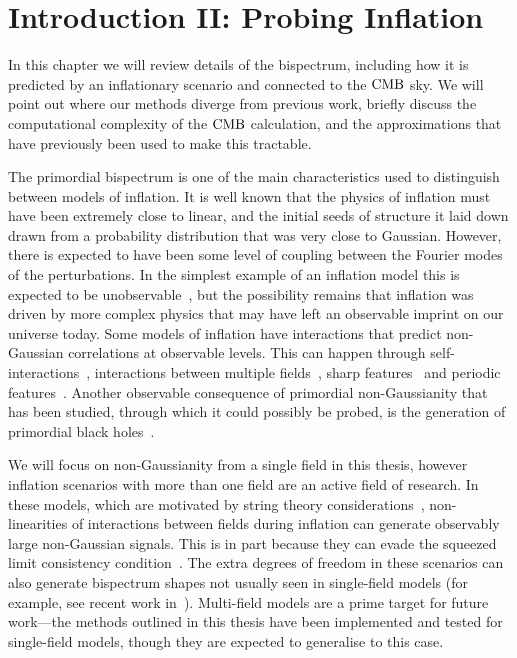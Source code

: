%
\chapter{Introduction II: Probing Inflation}\label{chapter:intro_bispectra}
In this chapter we will review details of the bispectrum, including how it is predicted
by an inflationary scenario and connected to the $\text{CMB}$ sky.
We will point out where our methods diverge from previous work,
briefly discuss the computational complexity of the $\text{CMB}$ calculation, and
the approximations that have previously been used to make this tractable.


The primordial bispectrum is one of the main
characteristics used to distinguish between models of inflation. It is well
known that the physics of inflation must have been extremely close
to linear, and the initial seeds of structure it laid down
drawn from a probability distribution that was
very close to Gaussian. However, there is expected to have been some level of coupling
between the Fourier modes of the perturbations.
In the simplest example of an inflation model this is
expected to be unobservable~\cite{Maldacena},
but the possibility remains that inflation was driven by
more complex physics that may have left an observable imprint on our universe today.
Some models of inflation have interactions that predict non-Gaussian
correlations at observable levels. This can happen through
self-interactions~\cite{px_burrage,dbi_in_the_sky},
interactions between multiple fields~\cite{Byrnes_2010, Gao_turn,
achucarro_multifield1, achucarro_multifield2, achucarro_robust_16, achucarro_natural,
achucarro_quad_viability, achucarro_gsr_cs_14, achucarro_cs_reduction_13,
achucarro_gong_cs_corr, achucarro_cs_12, achucarro_eft, curvaton_comprehensive},
sharp features~\cite{adshead, gsr, step_novaes}
and periodic features~\cite{flauger_pajer_resonant, Pajer_2013, Meerburg_2012, Meerburg_osc, Meerburg_2010,
Barnaby_2011, Peiris_2013, Easther_2013, Cabass_2018, Behbahani_2011}.
Another observable consequence of primordial non-Gaussianity
that has been studied,
through which it could possibly be probed, is the generation of primordial black
holes~\cite{pbh_byrnes, pbh_young, pbh_franciolini, pbh_passaglia}.


We will focus on non-Gaussianity from a single field in this thesis,
however inflation scenarios with more than one field are an
active field of research.
In these models, which are motivated by string theory considerations~\cite{achucarro_multifield1},
non-linearities of interactions between fields during inflation
can generate observably large non-Gaussian signals.
This is in part because they can evade the squeezed limit consistency condition~\cite{sqz_consistency}.
The extra degrees of freedom in these scenarios can also generate bispectrum shapes not usually
seen in single-field models (for example, see recent work in~\cite{RP_2, Fumagalli_2019}).
Multi-field models are a prime target for future work---the
methods outlined in this thesis have been implemented
and tested for single-field models,
though they are expected to generalise to this case.



